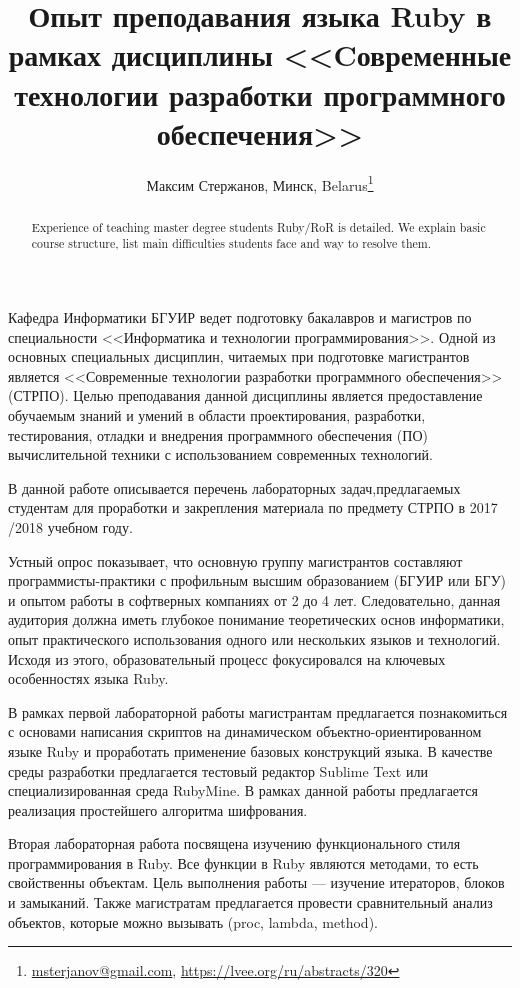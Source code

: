 \documentclass[10pt, a5paper]{article}
\begin{document}
\title{Опыт преподавания языка Ruby в рамках дисциплины <<Cовременные технологии разработки программного обеспечения>>}
\author{Максим Стержанов, Минск, Belarus\footnote{\url{msterjanov@gmail.com}, \url {https://lvee.org/ru/abstracts/320}}}
\maketitle
\begin{abstract}
Experience of teaching master degree students Ruby/RoR is detailed. We explain basic course structure, list main difficulties students face and way to resolve them. 
\end{abstract}
Кафедра Информатики БГУИР ведет подготовку бакалавров и магистров по специальности <<Информатика и технологии программирования>>. Одной из основных специальных дисциплин, читаемых при подготовке магистрантов является <<Современные технологии разработки программного обеспечения>>(СТРПО). Целью преподавания данной дисциплины является предоставление обучаемым знаний и умений в области проектирования, разработки, тестирования, отладки и внедрения программного обеспечения (ПО) вычислительной техники с использованием современных технологий.

В данной работе описывается перечень лабораторных задач,\linebreak предлагаемых студентам  для проработки и закрепления материала по предмету СТРПО в 2017 /2018 учебном году.

Устный опрос показывает, что основную группу магистрантов составляют программисты-практики с профильным высшим образованием (БГУИР или БГУ) и опытом работы в софтверных компаниях от 2 до 4 лет. Следовательно, данная аудитория должна иметь глубокое понимание теоретических основ информатики, опыт практического использования одного или нескольких языков и технологий. Исходя из этого, образовательный процесс фокусировался на ключевых особенностях языка Ruby.

В рамках первой лабораторной работы магистрантам предлагается познакомиться с основами написания скриптов на динамическом объектно-ориентированном языке Ruby и проработать применение базовых конструкций языка. В качестве среды разработки предлагается тестовый редактор Sublime Text или специализированная среда RubyMine. В рамках данной работы предлагается реализация простейшего алгоритма шифрования.

Вторая лабораторная работа посвящена изучению функционального стиля программирования в Ruby. Все функции в Ruby являются методами, то есть свойственны объектам. Цель выполнения работы --- изучение итераторов, блоков и замыканий. Также магистратам предлагается провести сравнительный анализ объектов, которые можно вызывать (proc, lambda, method).
\end{document}
